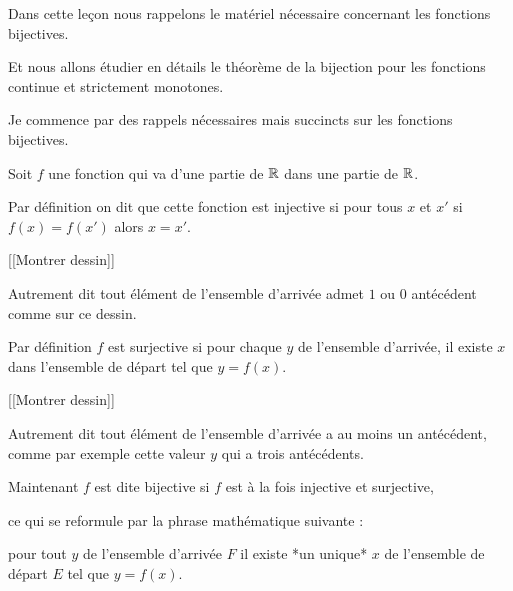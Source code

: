 







\debuttexte

\diapo


\change

\change

Dans cette leçon nous rappelons le matériel nécessaire concernant les fonctions bijectives.

\change

Et nous allons étudier en détails le théorème de la bijection pour les fonctions continue 
et strictement monotones.


\diapo

Je commence par des rappels nécessaires mais succincts sur les fonctions bijectives.


Soit $f$ une fonction qui va d'une partie de $\mathbb{R}$ dans une partie de $\mathbb{R}$.


\change

Par définition on dit que cette fonction est injective si
pour tous $x$ et $x'$ si $f(x)=f(x')$ alors $x=x'$.

[[Montrer dessin]]

Autrement dit tout élément de l'ensemble d'arrivée admet $1$ ou $0$ antécédent
comme sur ce dessin.


\change

Par définition $f$ est surjective si pour chaque $y$ de l'ensemble d'arrivée, il existe
$x$ dans l'ensemble de départ tel que $y=f(x)$.

[[Montrer dessin]]

Autrement dit tout élément de l'ensemble d'arrivée a au moins un antécédent, comme 
par exemple cette valeur $y$ qui a trois antécédents.



\change

Maintenant $f$ est dite bijective si $f$ est à la fois injective et surjective, 

ce qui se reformule par la phrase mathématique suivante :

pour tout $y$ de l'ensemble d'arrivée $F$ il existe *un unique*
$x$ de l'ensemble de départ $E$ tel que $y=f(x)$.

